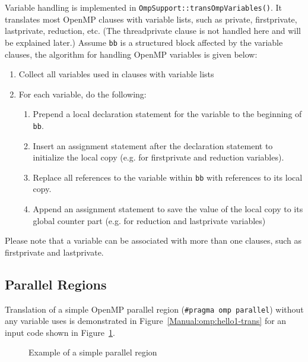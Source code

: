 Variable handling is implemented in \lstinline{OmpSupport::transOmpVariables()}. 
It translates most OpenMP clauses with variable lists, such as private, firstprivate, lastprivate, reduction, etc.
(The threadprivate clause is not handled here and will be explained later.)
Assume \lstinline{bb} is a structured block affected by the variable clauses, the algorithm for handling OpenMP variables is given below:
\begin{enumerate}
\item Collect all variables used in clauses with variable lists
\item For each variable, do the following:
\begin{enumerate}
\item Prepend a local declaration statement for the variable to the beginning of \lstinline{bb}.
\item Insert an assignment statement after the declaration statement to initialize the local copy (e.g. for firstprivate and reduction variables).
\item Replace all references to the variable within \lstinline{bb} with references to its local copy.
\item Append an assignment statement to save the value of the local copy to its global counter part (e.g. for reduction and lastprivate variables)
\end{enumerate}
\end{enumerate}
Please note that a variable can be associated with more than one clauses, such as firstprivate and lastprivate. 


\subsection{Parallel Regions}

Translation of a simple OpenMP parallel region 
(\lstinline{#pragma omp parallel}) without any variable uses is demonstrated in
Figure~\ref{Manual:omp:hello1-trans} for an input code shown in
Figure~\ref{Manual:omp:hello1}.

\lstset{language=C,basicstyle=\scriptsize}
\lstset{language=C,basicstyle=\scriptsize,numbers=left}
\begin{figure}[htbp]
{\indent
  {\mySmallFontSize
    \begin{latexonly}
    
    \end{latexonly}
    \begin{htmlonly}
    
    \end{htmlonly}
  }
}
\caption{Example of a simple parallel region}
\label{Manual:omp:hello1}
\end{figure}

